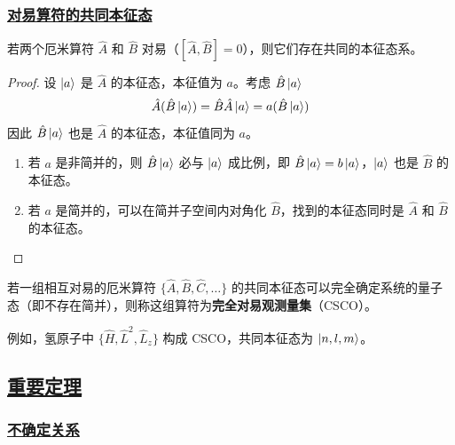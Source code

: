 \subsubsection{\protect\hyperlink{:}{对易算符的共同本征态}}

\begin{theorem}[对易厄米算符有共同本征态系]
    若两个厄米算符 $\hat{A}$ 和 $\hat{B}$ 对易（$[\hat{A}, \hat{B}] = 0$），则它们存在共同的本征态系。
\end{theorem}

\begin{proof}
    设 $\ket{a}$ 是 $\hat{A}$ 的本征态，本征值为 $a$。考虑 $\hat{B}\ket{a}$
    \begin{equation}
        \hat{A}(\hat{B}\ket{a}) = \hat{B}\hat{A}\ket{a} = a(\hat{B}\ket{a})
    \end{equation}
    因此 $\hat{B}\ket{a}$ 也是 $\hat{A}$ 的本征态，本征值同为 $a$。
    \begin{enumerate}
        \item 若 $a$ 是非简并的，则 $\hat{B}\ket{a}$ 必与 $\ket{a}$ 成比例，即 $\hat{B}\ket{a} = b\ket{a}$，$\ket{a}$ 也是 $\hat{B}$ 的本征态。
        \item 若 $a$ 是简并的，可以在简并子空间内对角化 $\hat{B}$，找到的本征态同时是 $\hat{A}$ 和 $\hat{B}$ 的本征态。
    \end{enumerate}
\end{proof}

\begin{definition}
    若一组相互对易的厄米算符 $\{\hat{A}, \hat{B}, \hat{C}, \ldots\}$ 的共同本征态可以完全确定系统的量子态（即不存在简并），则称这组算符为\textbf{完全对易观测量集}（CSCO）。
\end{definition}

例如，氢原子中 $\{\hat{H}, \hat{L}^2, \hat{L}_z\}$ 构成 CSCO，共同本征态为 $\ket{n,l,m}$。

\subsection{\protect\hyperlink{:}{重要定理}}

\subsubsection{\protect\hyperlink{:}{不确定关系}}

